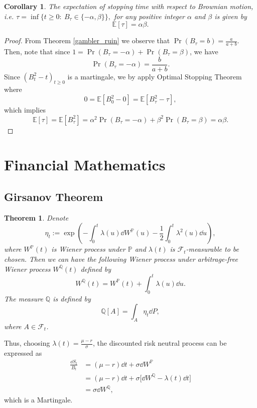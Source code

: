 \documentclass[10pt]{article}
\theoremstyle{remark}
\theoremstyle{plain}
\newtheorem{Theorem}{Theorem}[section]
\newtheorem{Corollary}{Corollary}[section]
\newcommand{\E}{\mathbb{E}}
\numberwithin{equation}{section}
\renewcommand{\geq}{\geqslant}
\begin{document}
\begin{Corollary}
	The expectation of stopping time with respect to Brownian motion, i.e. 
	$
		\tau = \inf \{t \geq 0:\ B_\tau \in \{ - \alpha, \beta\} \},
	$
	for any positive integer $\alpha$ and $\beta$ is given by 
	\[
		\mathbb{E}[\tau] = \alpha \beta.
	\]
\end{Corollary}

\begin{proof}
	From Theorem \eqref{gambler_ruin} we observe that $\Pr(B_\tau = b) = \frac{a}{a+b}$. Then, note that since $1 = \Pr(B_\tau = -\alpha) + \Pr(B_\tau = \beta) $, we have
	\[
		\Pr(B_\tau =  - \alpha) = \frac{b}{a+b}.
	\]
	 Since $(B_t^2 - t)_{t \geq 0}$ is a martingale, we by apply Optimal Stopping Theorem where
	\[
		0 = \mathbb{E}[B_0^2 - 0] = \mathbb{E} [B_\tau^2 - \tau], 
	\]
	which implies
	\[
	\mathbb{E}[\tau] = \E[B_\tau^2 ] =  \alpha^2 	\Pr(B_\tau =  - \alpha) + \beta^2 	\Pr(B_\tau =  \beta) = \alpha \beta.
	\]
\end{proof}

%
%
\clearpage
\section{Financial Mathematics}

\subsection{Girsanov Theorem}
\begin{Theorem}
	Denote
	\[
		\eta_t := \exp(-\int_0^t \lambda(u) \dd{W^\mathbb{P}(u)} - \frac{1}{2} \int_0^t \lambda^2(u) \dd{u}), 
	\]
	where $W^\mathbb{P}(t)$ is Wiener process under $\mathbb{P}$ and $\lambda(t) $ is $\mathcal{F}_t$-measurable to be chosen. Then we can have the following Wiener process under arbitrage-free Wiener process $W^\mathbb{Q}(t)$ defined by
	\[
		W^\mathbb{Q}(t) = W^\mathbb{P}(t) + \int_0^t \lambda(u) \dd{u}. 
	\]
	The measure $\mathbb{Q}$ is defined by 
	\[
	\mathbb{Q}[A] = \int_A \eta_t \dd{P},
	\]
	where $A \in \mathcal{F}_t$.
\end{Theorem}

Thus, choosing $\lambda(t) = \frac{\mu - r}{\sigma}$, the discounted risk neutral process can be expressed as
	\begin{align*}
		\frac{\dd{S_t}}{B_t} & = (\mu - r) \dd{t} + \sigma \dd{W^\mathbb{P}}
		\\
		& = (\mu - r) \dd{t} + \sigma \big[\dd{W^\mathbb{Q}} - \lambda(t) \dd{t} \big]
		\\
		& = \sigma \dd{W^\mathbb{Q}},
	\end{align*}
which is a Martingale.
\end{document}
